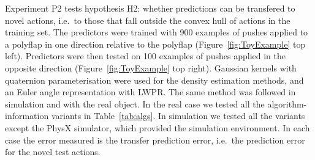 
Experiment P2 tests hypothesis H2: whether predictions can be
transfered to novel actions, i.e.\ to those that fall outside the
convex hull of actions in the training set.  The predictors were
trained with 900 examples of pushes applied to a polyflap in one
direction relative to the polyflap (Figure~\ref{fig:ToyExample} top
left).  Predictors were then tested on 100 examples of pushes applied
in the opposite direction (Figure~\ref{fig:ToyExample} top
right). Gaussian kernels with quaternion parameterisation were used
for the density estimation methods, and an Euler angle representation
with LWPR. The same method was followed in simulation and with the
real object. In the real case we tested all the algorithm-information
variants in Table~\ref{tab:algs}. In simulation we tested all the
variants except the PhysX simulator, which provided the simulation
environment. In each case the error measured is the transfer
prediction error, i.e.\ the prediction error for the novel test
actions.

